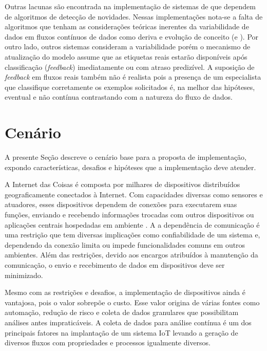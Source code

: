 Outras lacunas são encontrada na implementação de sistemas de que dependem de
algoritmos de detecção de novidades. Nessas implementações nota-se a falta de
algoritmos que tenham as considerações teóricas inerentes da variabilidade de
dados em fluxos contínuos de dados como deriva e evolução de conceito (\drift e
\evolution).
Por outro lado, outros sistemas consideram a variabilidade porém o
mecanismo de atualização do modelo assume que as etiquetas reais estarão
disponíveis após classificação (\emph{feedback}) imediatamente ou com atraso
predizível.
A suposição de \emph{feedback} em fluxos reais também não é realista pois
a presença de um especialista que classifique corretamente os exemplos
solicitados é, na melhor das hipóteses, eventual e não contínua contrastando com
a natureza do fluxo de dados.


\section{Cenário}\label{sec:cenario}

A presente Seção descreve o cenário base para a proposta de implementação,
expondo características, desafios e hipóteses que a implementação deve atender.

A Internet das Coisas \iot é composta por milhares de dispositivos distribuídos
geograficamente conectados à Internet.
Com capacidades diversas como sensores e atuadores, esses dispositivos dependem
de conexões para executarem suas funções, enviando e recebendo informações
trocadas com outros dispositivos ou aplicações centrais hospedadas em ambiente
\cloud.
A a dependência de comunicação é uma restrição que tem diversas implicações
como confiabilidade de um sistema e, dependendo da conexão limita ou impede
funcionalidades comuns em outros ambientes.
Além das restrições, devido aos encargos atribuídos à manutenção da comunicação,
o envio e recebimento de dados em dispositivos deve ser minimizado.


Mesmo com as restrições e desafios, a implementação de dispositivos ainda é
vantajosa, pois o valor sobrepõe o custo.
Esse valor origina de várias fontes como automação, redução de risco e coleta
de dados granulares que possibilitam análises antes impraticáveis.
A coleta de dados para análise contínua é um dos principais fatores na
implantação de um sistema IoT levando a geração de diversos fluxos com
propriedades e processos igualmente diversos.

